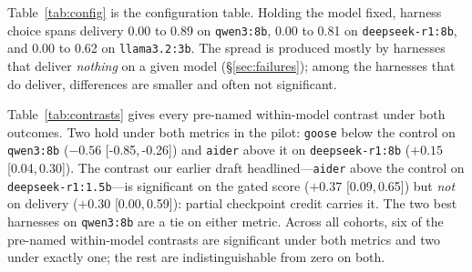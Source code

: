 \documentclass[10pt]{article}
\newcommand{\ci}[2]{[#1,\,#2]}
\begin{document}
Table~\ref{tab:config} is the configuration table. Holding the model fixed, harness choice spans
delivery 0.00 to 0.89 on \texttt{qwen3:8b}, 0.00 to 0.81 on \texttt{deepseek-r1:8b}, and 0.00 to
0.62 on \texttt{llama3.2:3b}. The spread is produced mostly by harnesses that deliver \emph{nothing}
on a given model (\S\ref{sec:failures}); among the harnesses that do deliver, differences are
smaller and often not significant.

Table~\ref{tab:contrasts} gives every pre-named within-model contrast under both outcomes.
Two hold under both metrics in the pilot: \texttt{goose} below the control on \texttt{qwen3:8b}
($-0.56$ \ci{-0.85}{-0.26}) and \texttt{aider} above it on \texttt{deepseek-r1:8b} ($+0.15$
\ci{0.04}{0.30}). The contrast our earlier draft headlined---\texttt{aider} above the control on
\texttt{deepseek-r1:1.5b}---is significant on the gated score ($+0.37$ \ci{0.09}{0.65}) but
\emph{not} on delivery ($+0.30$ \ci{0.00}{0.59}): partial checkpoint credit carries it. The two
best harnesses on \texttt{qwen3:8b} are a tie on either metric. Across all cohorts, six of the
pre-named within-model contrasts are significant under both metrics and two under exactly one;
the rest are indistinguishable from zero on both.
\end{document}

